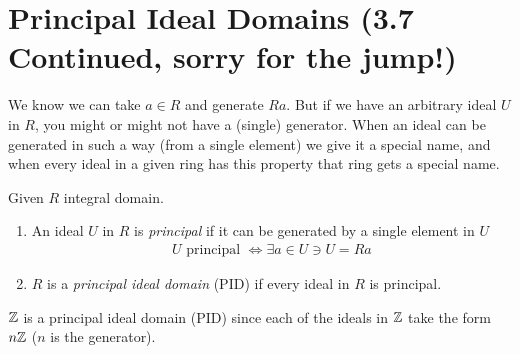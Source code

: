 \section{Principal Ideal Domains (3.7 Continued, sorry for the jump!)}
We know we can take $a\in R$ and generate $Ra$. But if we have an arbitrary ideal $U$ in $R$, you
might or might not have a (single) generator.
When an ideal can be generated in such a way (from a single element) we give it a special name, and
when every ideal in a given ring has this property that ring gets a special name.
\begin{definition}
    Given $R$ integral domain.
    \begin{enumerate}
        \item An ideal $U$ in $R$ is \textit{principal} if it can be generated by a single element
        in $U$
        \begin{align}
            U \text{ principal }\iff \exists a \in U \ni U = Ra \nonumber
        \end{align}
        \item $R$ is a \textit{principal ideal domain} (PID) if every ideal in $R$ is principal.
    \end{enumerate}
\end{definition}
${\mathbb{Z}}$ is a principal ideal domain (PID) since each of the ideals in ${\mathbb{Z}}$ take the form $n{\mathbb{Z}}$ ($n$ is
the generator).
